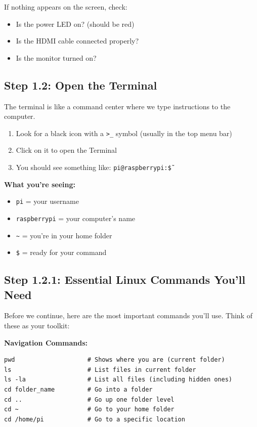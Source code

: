 \documentclass[12pt,a4paper]{article}
\begin{document}
\begin{tipbox}
If nothing appears on the screen, check:
\begin{itemize}
    \item Is the power LED on? (should be red)
    \item Is the HDMI cable connected properly?
    \item Is the monitor turned on?
\end{itemize}
\end{tipbox}

\subsection{Step 1.2: Open the Terminal}

The terminal is like a command center where we type instructions to the computer.

\begin{enumerate}
    \item Look for a black icon with a \texttt{>\_} symbol (usually in the top menu bar)
    \item Click on it to open the Terminal
    \item You should see something like: \texttt{pi@raspberrypi:\~\$}
\end{enumerate}

\begin{infobox}
\textbf{What you're seeing:}
\begin{itemize}
    \item \texttt{pi} = your username
    \item \texttt{raspberrypi} = your computer's name
    \item \texttt{\~} = you're in your home folder
    \item \texttt{\$} = ready for your command
\end{itemize}
\end{infobox}

\subsection{Step 1.2.1: Essential Linux Commands You'll Need}

Before we continue, here are the most important commands you'll use. Think of these as your toolkit:

\textbf{Navigation Commands:}
\begin{lstlisting}
pwd                    # Shows where you are (current folder)
ls                     # List files in current folder
ls -la                 # List all files (including hidden ones)
cd folder_name         # Go into a folder
cd ..                  # Go up one folder level
cd ~                   # Go to your home folder
cd /home/pi            # Go to a specific location
\end{lstlisting}
\end{document}
